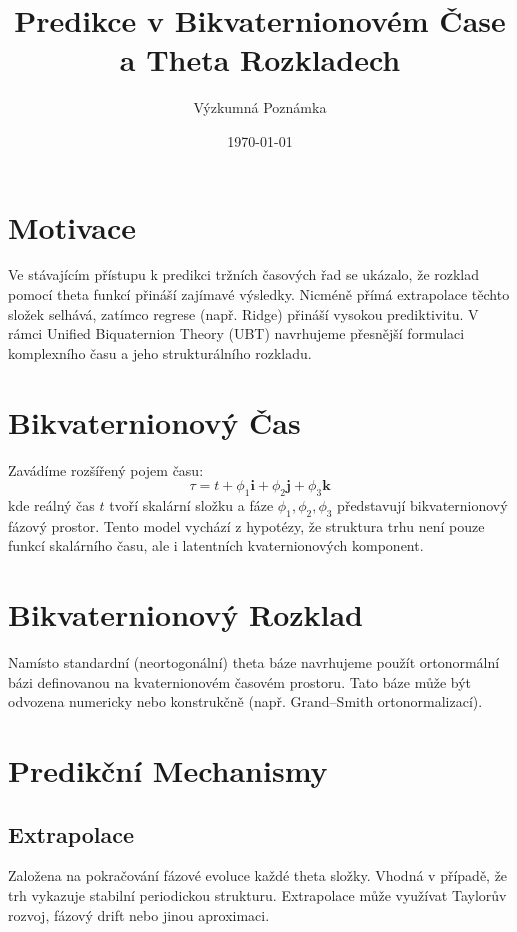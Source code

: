 \documentclass{article}
\title{Predikce v Bikvaternionovém Čase a Theta Rozkladech}
\author{Výzkumná Poznámka}
\date{\today}
\begin{document}
\maketitle

\section{Motivace}

Ve stávajícím přístupu k predikci tržních časových řad se ukázalo, že rozklad pomocí theta funkcí přináší zajímavé výsledky. Nicméně přímá extrapolace těchto složek selhává, zatímco regrese (např. Ridge) přináší vysokou prediktivitu. V rámci Unified Biquaternion Theory (UBT) navrhujeme přesnější formulaci komplexního času a jeho strukturálního rozkladu.

\section{Bikvaternionový Čas}

Zavádíme rozšířený pojem času:
\[
\tau = t + \phi_1 \mathbf{i} + \phi_2 \mathbf{j} + \phi_3 \mathbf{k}
\]
kde reálný čas $t$ tvoří skalární složku a fáze $\phi_1, \phi_2, \phi_3$ představují bikvaternionový fázový prostor. Tento model vychází z hypotézy, že struktura trhu není pouze funkcí skalárního času, ale i latentních kvaternionových komponent.

\section{Bikvaternionový Rozklad}

Namísto standardní (neortogonální) theta báze navrhujeme použít ortonormální bázi definovanou na kvaternionovém časovém prostoru. Tato báze může být odvozena numericky nebo konstrukčně (např. Grand--Smith ortonormalizací).

\section{Predikční Mechanismy}

\subsection{Extrapolace}

Založena na pokračování fázové evoluce každé theta složky. Vhodná v případě, že trh vykazuje stabilní periodickou strukturu. Extrapolace může využívat Taylorův rozvoj, fázový drift nebo jinou aproximaci.
\end{document}
